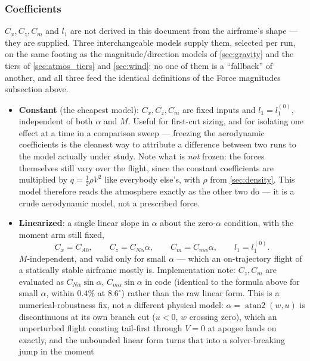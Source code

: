 \subsubsection{Coefficients}\label{sec:aero_coeffs}
$C_x,C_z,C_m$ and $l_1$ are not derived in this document from the airframe's shape --- they are
supplied. Three interchangeable models supply them, selected per run, on the same footing as the
magnitude/direction models of \autoref{sec:gravity} and the tiers of \autoref{sec:atmos_tiers} and
\autoref{sec:wind}: no one of them is a ``fallback'' of another, and all three feed the identical
definitions of the Force magnitudes subsection above.
\begin{itemize}
    \item \textbf{Constant} (the cheapest model): $C_x,C_z,C_m$ are fixed inputs and
    $l_1=l_1^{(0)}$, independent of both $\alpha$ and $M$. Useful for first-cut sizing, and for
    isolating one effect at a time in a comparison sweep --- freezing the aerodynamic coefficients
    is the cleanest way to attribute a difference between two runs to the model actually under
    study. Note what is \emph{not} frozen: the forces themselves still vary over the flight, since
    the constant coefficients are multiplied by $q=\tfrac12\rho V^2$ like everybody else's, with
    $\rho$ from \autoref{sec:density}. This model therefore reads the atmosphere exactly as the
    other two do --- it is a crude aerodynamic model, not a prescribed force.
    \item \textbf{Linearized}: a single linear slope in $\alpha$ about the zero-$\alpha$ condition,
    with the moment arm still fixed,
    \begin{equation} \label{eq:aero_linearized}
        C_x = C_{A0}, \qquad C_z = C_{N\alpha}\alpha, \qquad C_m = C_{m\alpha}\alpha, \qquad l_1 = l_1^{(0)}.
    \end{equation}
    $M$-independent, and valid only for small $\alpha$ --- which an on-trajectory flight of a
    statically stable airframe mostly is. Implementation note: $C_z,C_m$ are evaluated as
    $C_{N\alpha}\sin\alpha$, $C_{m\alpha}\sin\alpha$ in code (identical to the formula above for
    small $\alpha$, within $0.4\%$ at $8.6^\circ$) rather than the raw linear form. This is a
    numerical-robustness fix, not a different physical model:
    $\alpha=\operatorname{atan2}(w,u)$ is discontinuous at its own branch cut ($u<0$, $w$ crossing
    zero), which an unperturbed flight coasting tail-first through $V=0$ at apogee lands on
    exactly, and the unbounded linear form turns that into a solver-breaking jump in the moment

\end{itemize}
